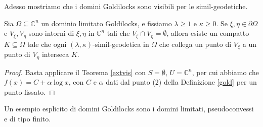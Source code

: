 Adesso mostriamo che i domini Goldilocks sono visibili per le simil-geodetiche.

\begin{cor} \label{gold_is_vis}
    Sia $\Omega\subseteq\mathbb{C}^n$ un dominio limitato Goldilocks, e fissiamo $\lambda\ge 1$ e $\kappa\ge 0$. Se $\xi,\eta\in\partial\Omega$ e $V_\xi,V_\eta$ sono intorni di $\xi,\eta$ in $\mathbb{C}^n$ tali che $\overline{V}_\xi\cap\overline{V}_\eta=\emptyset$, allora esiste un compatto $K\subseteq\Omega$ tale che ogni $(\lambda,\kappa)$-simil-geodetica in $\Omega$ che collega un punto di $V_\xi$ a un punto di $V_\eta$ interseca $K$.
\end{cor}

\begin{proof}
    Basta applicare il Teorema \ref{extvis} con $S=\emptyset$, $U=\mathbb{C}^n$, per cui abbiamo che $f(x)=C+\alpha\log{x}$, con $C$ e $\alpha$ dati dal punto (2) della Definizione \ref{gold} per un punto fissato.
\end{proof}

Un esempio esplicito di domini Goldilocks sono i domini limitati, pseudoconvessi e di tipo finito.